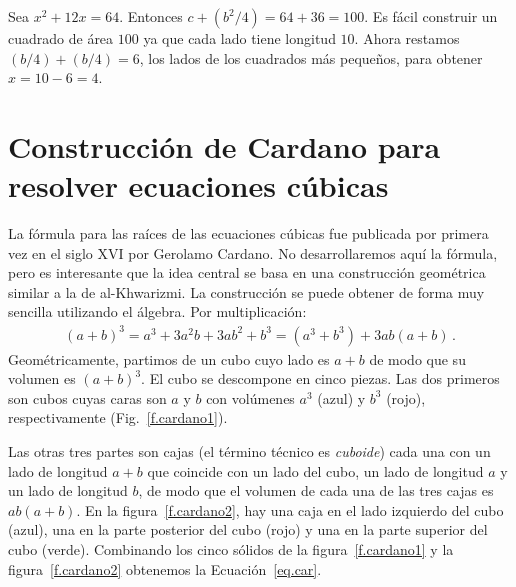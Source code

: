 \begin{example}
Sea $x^2+12x=64$. Entonces $c+(b^2/4)=64+36=100$. Es fácil construir un cuadrado de área $100$ ya que cada lado tiene longitud $10$. Ahora restamos $(b/4)+(b/4)=6$, los lados de los cuadrados más pequeños, para obtener $x=10-6=4$.
\end{example}

\section{Construcción de Cardano para resolver ecuaciones cúbicas}\label{s.cardano}

La fórmula para las raíces de las ecuaciones cúbicas fue publicada por primera vez en el siglo XVI por Gerolamo Cardano. No desarrollaremos aquí la fórmula, pero es interesante que la idea central se basa en una construcción geométrica similar a la de al-Khwarizmi. La construcción se puede obtener de forma muy sencilla utilizando el álgebra. Por multiplicación:
\begin{align}\label{eq.car}
(a+b)^3=a^3+3a^2b+3ab^2+b^3=(a^3+b^3)+3ab(a+b)\,.
\end{align}
Geométricamente, partimos de un cubo cuyo lado es $a+b$ de modo que su volumen es $(a+b)^3$. El cubo se descompone en cinco piezas. Las dos primeros son cubos cuyas caras son $a$ y $b$ con volúmenes $a^3$ (azul) y $b^3$ (rojo), respectivamente (Fig.~\ref{f.cardano1}).

Las otras tres partes son cajas (el término técnico es \emph{cuboide}) cada una con un lado de longitud $a+b$ que coincide con un lado del cubo, un lado de longitud $a$ y un lado de longitud $b$, de modo que el volumen de cada una de las tres cajas es $ab(a+b)$. En la figura~\ref{f.cardano2}, hay una caja en el lado izquierdo del cubo (azul), una en la parte posterior del cubo (rojo) y una en la parte superior del cubo (verde).
Combinando los cinco sólidos de la figura~\ref{f.cardano1} y la figura~\ref{f.cardano2} obtenemos la Ecuación~\ref{eq.car}.

